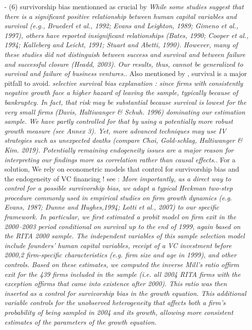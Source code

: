 \begin{itemize}
\begin{itemize}
- (6) survivorship bias mentionned as crucial by \citep{unger2011human} \textit{While some studies suggest that there is a significant positive relationship between human capital variables and survival (e.g., Bruederl et al., 1992; Evans and Leighton, 1989; Gimeno et al., 1997), others have reported insignificant relationships (Bates, 1990; Cooper et al., 1994; Kalleberg and Leicht, 1991; Stuart and Abetti, 1990). However, many of these studies did not distinguish between success and survival and between failure and successful closure (Headd, 2003). Our results, thus, cannot be generalized to survival and failure of business ventures.}. Also mentioned by \citet{grillitsch2020does}, survival is a major pitfall to avoid. \textit{selective survival bias explanation : since firms with consistently negative growth face a higher hazard of leaving the sample, typically because of bankruptcy. In fact, that risk may be substantial because survival is lowest for the very small firms (Davis, Haltiwanger & Schuh. 1996) dominating our estimation sample. We have partly controlled for that by using a potentially more robust growth measure (see Annex 3). Yet, more advanced techniques may use IV strategies such as unexpected deaths (compare Choi, Gold-schlag, Haltiwanger & Kim. 2019). Potentially remaining endogeneity issues are a major reason for interpreting our findings more as correlation rather than causal effects.}. For a solution, We rely on econometric models that control for survivorship bias and the endogeneity of VC financing ! see : \citet{colombo2010growth} \textit{More importantly, as a direct way to control for a possible survivorship bias, we adapt a typical Heckman two-step procedure commonly used in empirical studies on firm growth dynamics (e.g. Evans, 1987; Dunne and Hughes,1994; Lotti et al., 2007) to our specific framework. In particular, we first estimated a probit model on firm exit in the 2000–2003 period conditional on survival up to the end of 1999, again based on the RITA 2000 sample. The independent variables of this sample selection model include founders' human capital variables, receipt of a VC investment before 2000,2 firm-specific characteristics (e.g. firm size and age in 1999), and other controls. Based on these estimates, we computed the inverse Mill's ratio offirm exit for the 439 firms included in the sample (i.e. all 2004 RITA firms with the exception offirms that came into existence after 2000). This ratio was then inserted as a control for survivorship bias in the growth equation. This additional variable controls for the unobserved heterogeneity that affects both a firm's probability of being sampled in 2004 and its growth, allowing more consistent estimates of the parameters of the growth equation.}\newline


\end{itemize}
\end{itemize}
